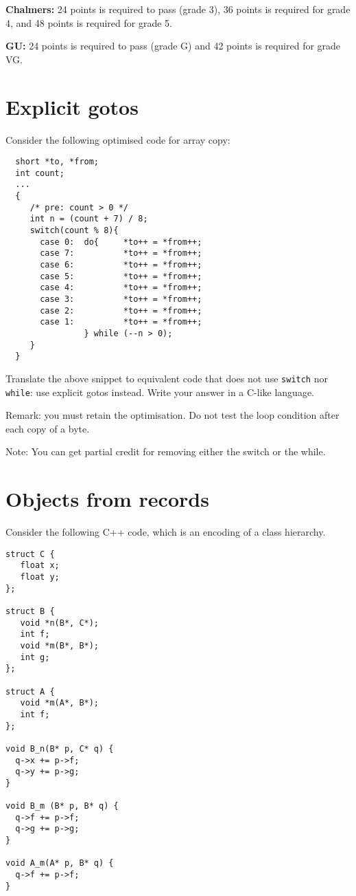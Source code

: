 \documentclass{article}
\begin{document}
  
\textbf{Chalmers:}
24 points is required to pass (grade 3), 36 points is required for
grade 4, and 48 points is required for grade 5. 

\textbf{GU:} 
24 points is required to pass (grade G) and 42 points is
required for grade VG.


\newpage


\section{Explicit gotos}

Consider the following optimised code for array copy:
\begin{verbatim}
  short *to, *from;
  int count;
  ...
  {
     /* pre: count > 0 */
     int n = (count + 7) / 8;
     switch(count % 8){
       case 0:	do{     *to++ = *from++;
       case 7:	        *to++ = *from++;
       case 6:	        *to++ = *from++;
       case 5:	        *to++ = *from++;
       case 4:	        *to++ = *from++;
       case 3:	        *to++ = *from++;
       case 2:	        *to++ = *from++;
       case 1:	        *to++ = *from++;
                } while (--n > 0);
     }
  }
\end{verbatim}

Translate the above snippet to equivalent code that does not use
\texttt{switch} nor \texttt{while}: use explicit gotos instead.
Write your answer in a C-like language.

Remark: you must retain the optimisation. Do not test the loop
condition after each copy of a byte.

Note: You can get partial credit for removing either the switch or the
while.

\newpage
\section{Objects from records}

Consider the following C++ code, which is an encoding of a class
hierarchy.
\begin{verbatim}
struct C {
   float x;
   float y;
};

struct B {
   void *n(B*, C*);
   int f;
   void *m(B*, B*);
   int g;
};

struct A {
   void *m(A*, B*);
   int f;
};

void B_n(B* p, C* q) {
  q->x += p->f;
  q->y += p->g;
}

void B_m (B* p, B* q) {
  q->f += p->f;
  q->g += p->g;
}

void A_m(A* p, B* q) {
  q->f += p->f;
}
\end{verbatim}
\end{document}
